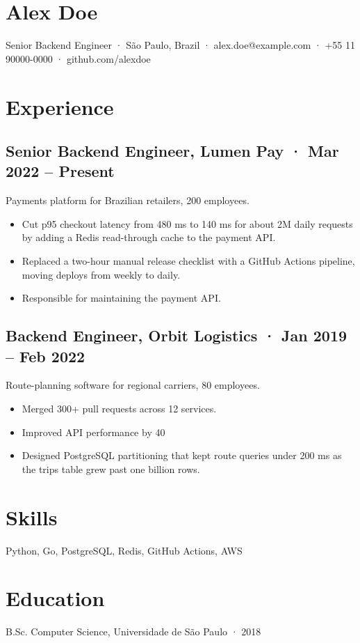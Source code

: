 \documentclass{article}
\begin{document}
\section*{Alex Doe}
Senior Backend Engineer · São Paulo, Brazil · alex.doe@example.com · +55 11 90000-0000 · github.com/alexdoe

\section*{Experience}

\subsection*{Senior Backend Engineer, Lumen Pay · Mar 2022 – Present}
Payments platform for Brazilian retailers, 200 employees.
\begin{itemize}
\item Cut p95 checkout latency from 480 ms to 140 ms for about 2M daily requests by adding a Redis read-through cache to the payment API.
\item Replaced a two-hour manual release checklist with a GitHub Actions pipeline, moving deploys from weekly to daily.
\item Responsible for maintaining the payment API.
\end{itemize}

\subsection*{Backend Engineer, Orbit Logistics · Jan 2019 – Feb 2022}
Route-planning software for regional carriers, 80 employees.
\begin{itemize}
\item Merged 300+ pull requests across 12 services.
\item Improved API performance by 40%
\item Designed PostgreSQL partitioning that kept route queries under 200 ms as the trips table grew past one billion rows.
\end{itemize}

\section*{Skills}
Python, Go, PostgreSQL, Redis, GitHub Actions, AWS

\section*{Education}
B.Sc. Computer Science, Universidade de São Paulo · 2018
\end{document}
